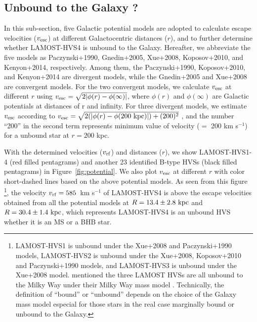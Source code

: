 \documentclass[iop, aj]{emulateapj}
\begin{document}
\subsection{Unbound to the Galaxy ?}
In this sub-section, five Galactic potential models \citep{1990ApJ...348..485P, 2005ApJ...634..344G, 2008ApJ...684.1143X, 2010ApJ...712..260K, 2014ApJ...793..122K} are adopted to calculate escape velocities ($v_{\rm esc}$) at different Galactocentric distances ($r$), and to further determine whether LAMOST-HVS4 is unbound to the Galaxy. Hereafter, we abbreviate the five models as Paczynski+1990, Gnedin+2005, Xue+2008, Koposov+2010, and Kenyon+2014, respectively. Among them, the Paczynski+1990, Koposov+2010, and Kenyon+2014 are divergent models, while the Gnedin+2005 and Xue+2008 are convergent models. For the two convergent models, we calculate $v_{\rm esc}$ at different $r$ using $v_{\rm esc} = \sqrt{2|\phi(r) - \phi(\infty)|}$, where $\phi(r)$ and $\phi(\infty)$ are Galactic potentials at distances of r and infinity. For three divergent models, we estimate $v_{\rm esc}$ according to $v_{\rm esc} = \sqrt{2(|\phi(r) - \phi(200~\rm kpc)|) + (200)^{2}}$ \citep{2008ApJ...680..312K}, and the number ``200'' in the second term represents minimum value of velocity ($=$ 200 km s$^{-1}$) for a unbound star at $r = 200$ kpc.

With the determined velocities ($v_{\rm rf}$) and distances ($r$), we show LAMOST-HVS1-4 (red filled pentagrams) and another 23 identified B-type HVSs (black filled pentagrams) in Figure~\ref{fig:potential}. We also plot $v_{\rm esc}$ at different $r$ with color short-dashed lines based on the above potential models. As seen from this figure \footnote{LAMOST-HVS1 is unbound under the Xue+2008 and Paczynski+1990 models, LAMOST-HVS2 is unbound under the Xue+2008, Koposov+2010 and Paczynski+1990 models, and LAMOST-HVS3 is unbound under the Xue+2008 model. \citet{2017ApJ...847L...9H} mentioned the three LAMOST HVSs are all unbound to the Milky Way under their Milky Way mass model \citep{2016MNRAS.463.2623H, 2017submitted}. Technically, the definition of ``bound'' or ``unbound'' depends on the choice of the Galaxy mass model especial for those stars in the real case marginally bound or unbound to the Galaxy.}, the velocity $v_{\rm rf} = 585$~km s$^{-1}$ of LAMOST-HVS4 is above the escape velocities obtained from all the potential models at $R = 13.4 \pm 2.8~\rm kpc$ and $R = 30.4 \pm 1.4~\rm kpc$, which represents LAMOST-HVS4 is an unbound HVS whether it is an MS or a BHB star.
\end{document}

